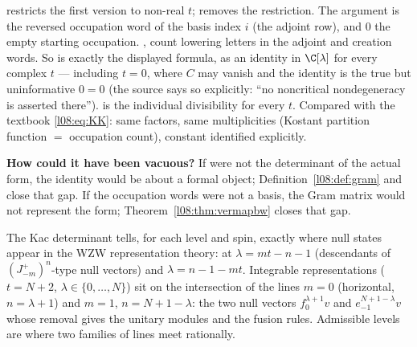 \begin{dictionary}
 restricts the first version to non-real $t$;  removes the restriction. The
argument \allowbreak{}\allowbreak{}\allowbreak{}\allowbreak{} is the reversed occupation word of the basis index $i$
(the adjoint row), and $0$ the empty starting occupation. ,  count
lowering letters in the adjoint and creation words. So \allowbreak{}\allowbreak{}\allowbreak{}
is exactly the displayed formula, as an identity in $\C[\lambda]$ for every complex $t$ --- including $t=0$,
where $C$ may vanish and the identity is the true but uninformative $0=0$ (the source says so explicitly:
``no noncritical nondegeneracy is asserted there'').  is the individual divisibility
for every $t$. Compared with the textbook \eqref{l08:eq:KK}: same factors, same multiplicities
(Kostant partition function $=$ occupation count), constant identified explicitly.

\textbf{How could it have been vacuous?} If  were not the determinant of the actual
form, the identity would be about a formal object; Definition~\ref{l08:def:gram} and
\allowbreak{} close that gap. If the occupation words were not a basis, the Gram
matrix would not represent the form; Theorem~\ref{l08:thm:vermapbw} closes that gap.
\end{dictionary}

\begin{physics}
The Kac determinant tells, for each level and spin, exactly where null states appear in the WZW
representation theory: at $\lambda = mt-n-1$ (descendants of $(J^+_{-m})^n$-type null vectors) and
$\lambda = n-1-mt$. Integrable representations ($t=N+2$, $\lambda\in\{0,\ldots,N\}$) sit on the intersection of the
lines $m=0$ (horizontal, $n=\lambda+1$) and $m=1$, $n = N+1-\lambda$: the two null vectors $f_0^{\lambda+1}v$ and
$e_{-1}^{N+1-\lambda}v$ whose removal gives the unitary modules and the fusion rules. Admissible levels are
where two families of lines meet rationally.
\end{physics}

